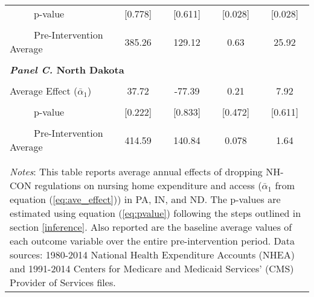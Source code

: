 \documentclass[../Main.tex]{subfiles}
\begin{document}
\begin{table}[htbp]
\begin{tabular}{l*{4}{c}}
\\[-2ex]
\multicolumn{1}{l}{\ \ \ \ \ p-value}  &\multicolumn{1}{c}{[0.778]}&\multicolumn{1}{c}{[0.611]}&\multicolumn{1}{c}{[0.028]}&\multicolumn{1}{c}{[0.028]}\\
\\[-2ex]
\multicolumn{1}{l}{\ \ \ \ \ Pre-Intervention Average}&   \multicolumn{1}{c}{385.26}&   \multicolumn{1}{c}{129.12}&   \multicolumn{1}{c}{0.63}&   \multicolumn{1}{c}{25.92}\\
\\[-.1ex]
\multicolumn{5}{l}{\textbf{\textit{Panel C.} North Dakota}}\\
\\[-1.5ex]
\multicolumn{1}{l}{Average Effect ($\bar{\alpha}_1$)}&   \multicolumn{1}{c}{37.72}&   \multicolumn{1}{c}{-77.39}&  \multicolumn{1}{c}{0.21}&   \multicolumn{1}{c}{7.92}\\
\\[-2ex]
\multicolumn{1}{l}{\ \ \ \ \ p-value}  &\multicolumn{1}{c}{[0.222]}&\multicolumn{1}{c}{[0.833]}&\multicolumn{1}{c}{[0.472]}&\multicolumn{1}{c}{[0.611]}\\
\\[-2ex]
\multicolumn{1}{l}{\ \ \ \ \ Pre-Intervention Average}&   \multicolumn{1}{c}{414.59}&   \multicolumn{1}{c}{140.84}&   \multicolumn{1}{c}{0.078}&   \multicolumn{1}{c}{1.64}\\
\\[-.1ex]
\hline\hline
\\[-2ex]
\multicolumn{5}{p{.93\linewidth}}{\footnotesize \textit{Notes}: This table reports average annual effects of dropping NH-CON regulations on nursing home expenditure and access ($\bar{\alpha}_1$ from equation (\ref{eq:ave_effect})) in PA, IN, and ND. The p-values are estimated using equation (\ref{eq:pvalue}) following the steps outlined in section \ref{inference}. Also reported are the baseline average values of each outcome variable over the entire pre-intervention period. Data sources: 1980-2014 National Health Expenditure Accounts (NHEA) and 1991-2014 Centers for Medicare and Medicaid Services’ (CMS) Provider of Services files.}
\end{tabular}
\end{table}
\vfill
\clearpage
\end{document}
